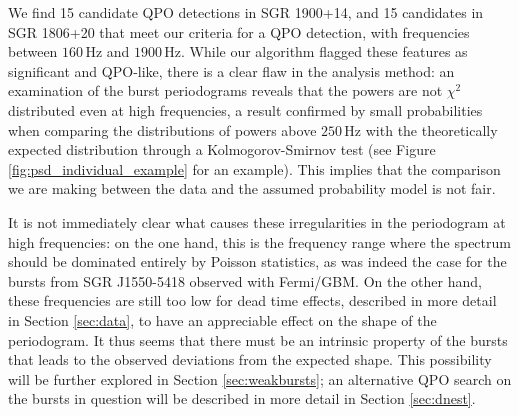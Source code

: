 \documentclass[numberedappendix]{emulateapj}
\newcommand{\hz}{\,\mathrm{Hz}}
\begin{document}
We find 15 candidate QPO detections in SGR 1900+14, and 15 candidates in SGR 1806+20 that meet our criteria for a QPO detection, with frequencies between $160\hz$ and $1900\hz$. While our algorithm
flagged these features as significant and QPO-like, there is a clear flaw in the analysis method: an examination of the burst periodograms reveals that the powers are not $\chi^2$ distributed even at high frequencies,
a result confirmed by small probabilities when comparing the distributions of powers above $250 \hz$ with the theoretically expected distribution through a Kolmogorov-Smirnov test (see Figure \ref{fig:psd_individual_example} for
an example). This implies that the comparison we are making between the data and the assumed probability model is not fair.

It is not immediately clear what causes these irregularities in the periodogram at high frequencies: on the one hand, this is the frequency range where the spectrum should be dominated entirely by Poisson statistics,
as was indeed the case for the bursts from SGR J1550-5418 observed with Fermi/GBM. On the other hand, these frequencies are still too low for dead time effects, described in more detail in Section \ref{sec:data}, to have an
appreciable effect on the shape of the periodogram. It thus seems that there must be an intrinsic property of the bursts that leads to the observed deviations from the expected shape. This possibility will be further
explored in Section \ref{sec:weakbursts}; an alternative QPO search on the bursts in question will be described in more detail in Section \ref{sec:dnest}.


\end{document}
